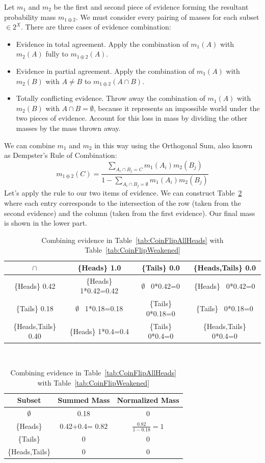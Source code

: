 \documentclass[letterpaper]{article}
\begin{document}
Let $m_1$ and $m_2$ be the first and second piece of evidence forming the resultant probability mass $m_{1 \oplus 2}$.  We must consider every pairing of masses for each subset $\in 2^X$.  There are three cases of evidence combination:
\begin{itemize}
\item Evidence in total agreement. Apply the combination of $m_1(A)$ with $m_2(A)$ fully to $m_{1 \oplus 2}(A)$.
\item Evidence in partial agreement.  Apply the combination of $m_1(A)$ with $m_2(B)$ with $A \neq B$ to $m_{1 \oplus 2}(A \cap B)$.
\item Totally conflicting evidence.  Throw away the combination of $m_1(A)$ with $m_2(B)$ with $A \cap B = \emptyset$, because it represents an impossible world under the two pieces of evidence.  Account for this loss in mass by dividing the other masses by the mass thrown away.
\end{itemize}
We can combine $m_1$ and $m_2$ in this way using the Orthogonal Sum, also known as Dempster's Rule of Combination:
\[
m_{1 \oplus 2}(C) = \dfrac{\displaystyle\sum_{A_i \cap B_j = C}m_1(A_i)m_2(B_j)}
	{1-\displaystyle\sum_{A_i \cap B_j = \emptyset}m_1(A_i)m_2(B_j)}
\]
Let's apply the rule to our two items of evidence.  We can construct Table~\ref{tab:CombineCoinFlip} where each entry corresponds to the intersection of the row (taken from the second evidence) and the column (taken from the first evidence).  Our final mass is shown in the lower part.

\begin{table}[htbp]
\centering
\caption{Combining evidence in Table~\ref{tab:CoinFlipAllHeads} with Table~\ref{tab:CoinFlipWeakened}}
\begin{tabular}{|c|ccc|}
\hline 
$\cap$ & \{Heads\} 1.0 & \{Tails\} 0.0 & \{Heads,Tails\} 0.0 \\ 
\hline 
\{Heads\} 0.42 & \{Heads\} 1*0.42=0.42 & $\emptyset$ \ 0*0.42=0 & \{Heads\} \ 0*0.42=0 \\ 

\{Tails\} 0.18 & $\emptyset$ \ 1*0.18=0.18 & \{Tails\} 0*0.18=0 & \{Tails\} \ 0*0.18=0 \\ 

\{Heads,Tails\} 0.40 & \{Heads\} 1*0.4=0.4 & \{Tails\} 0*0.4=0 & \{Heads,Tails\} 0*0.4=0 \\ 
\hline 
\end{tabular}
\\
\begin{tabular}{|c|c|c|}
Subset & Summed Mass & Normalized Mass \\
\hline
$\emptyset$ & 0.18 & 0 \\
\{Heads\} & 0.42+0.4= 0.82 & $\frac{0.82}{1-0.18} = 1$ \\
\{Tails\} & 0 & 0 \\
\{Heads,Tails\} & 0 & 0 \\
\hline
\end{tabular}
\label{tab:CombineCoinFlip}
\end{table}
\end{document}
